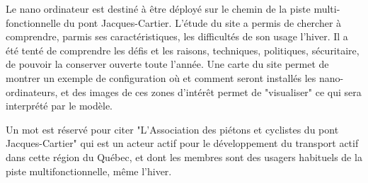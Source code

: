 ﻿\par Le nano ordinateur est destiné à être déployé sur le chemin de la piste multi-fonctionnelle du pont Jacques-Cartier. L'étude du site a permis de chercher à comprendre, parmis ses caractéristiques, les difficultés de son usage l'hiver. Il a été tenté de comprendre les défis et les raisons, techniques, politiques, sécuritaire, de pouvoir la conserver ouverte toute l'année. Une carte du site permet de montrer un exemple de configuration où et comment seront installés les nano-ordinateurs, et des images de ces  zones d'intérêt permet de "visualiser" ce qui sera interprété par le modèle. 
\par Un mot est réservé pour citer "L'Association des piétons et cyclistes du pont Jacques-Cartier" qui est un acteur actif pour le développement du transport actif dans cette région du Québec, et dont les membres sont des usagers habituels de la piste multifonctionnelle, même l'hiver.

